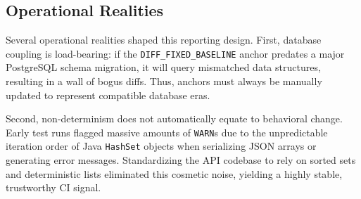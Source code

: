 \subsection{Operational Realities}
Several operational realities shaped this reporting design. First, database coupling
is load-bearing: if the \texttt{DIFF\_FIXED\_BASELINE} anchor predates a major
PostgreSQL schema migration, it will query mismatched data structures, resulting
in a wall of bogus diffs. Thus, anchors must always be manually updated to represent
compatible database eras.

Second, non-determinism does not automatically equate to behavioral change. Early
test runs flagged massive amounts of \texttt{WARN}s due to the unpredictable
iteration order of Java \texttt{HashSet} objects when serializing \ac{JSON} arrays
or generating error messages. Standardizing the \ac{API} codebase to rely on
sorted sets and deterministic lists eliminated this cosmetic noise,
yielding a highly stable, trustworthy \ac{CI} signal.